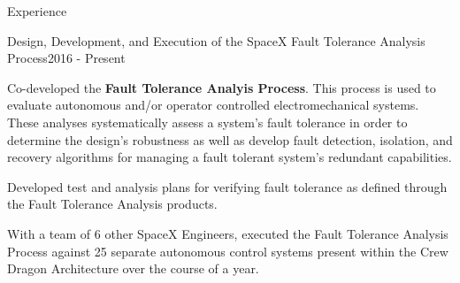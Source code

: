 \documentclass{resume} %
\begin{document}
\begin{rSection}{Experience}
\begin{rSubsection}{Design, Development, and Execution of the SpaceX Fault Tolerance Analysis Process}{2016 - Present}{}
\item Co-developed the \textbf{Fault Tolerance Analyis Process}. This
  process is used to evaluate autonomous and/or operator controlled
  electromechanical systems. These analyses systematically assess a
  system's fault tolerance in order to determine the design's
  robustness as well as develop fault detection, isolation, and
  recovery algorithms for managing a fault tolerant system's redundant
  capabilities.
\item Developed test and analysis plans for verifying fault tolerance
  as defined through the Fault Tolerance Analysis products.
\item With a team of 6 other SpaceX Engineers, executed the Fault Tolerance
  Analysis Process against 25 separate autonomous control systems present
  within the Crew Dragon Architecture over the course of a year.

\end{rSubsection}

\end{rSection}
\end{document}

